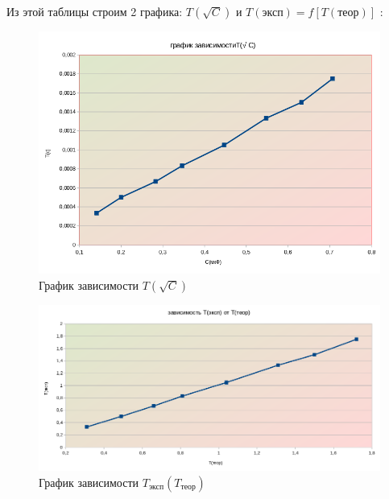 \documentclass[a4paper, 12pt]{article}%
\begin{document}
Из этой таблицы строим 2 графика: $T(\sqrt{C})$ и $T(\text{эксп}) = f\left[T(\text{теор})\right]$ :

\begin{figure}[h!]
\begin{center}
\includegraphics[width = 1.0\textwidth]{graph11.jpg}
\caption{График зависимости $T(\sqrt{C})$}
\end{center}
\end{figure}

\begin{figure}[h!]
\begin{center}
\includegraphics[width = 1.0\textwidth]{graph2.jpg}
\caption{График зависимости $T_{\text{эксп}}(T_{\text{теор}})$}
\end{center}
\end{figure}
\end{document}
